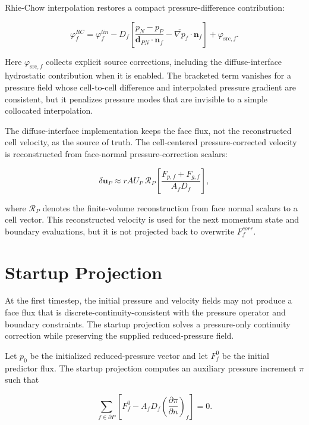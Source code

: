\documentclass[11pt]{article}
\newcommand{\grad}{\nabla}
\begin{document}
Rhie-Chow interpolation restores a compact pressure-difference contribution:

\begin{equation}
  \varphi_f^{RC}
  =
  \varphi_f^{lin}
  -
  D_f
  \left[
    \frac{p_N-p_P}{\mathbf{d}_{PN}\cdot\mathbf{n}_f}
    -
    \overline{\grad p}_f\cdot\mathbf{n}_f
  \right]
  +
  \varphi_{\mathrm{src},f}.
  \label{eq:rhie-chow}
\end{equation}

Here \(\varphi_{\mathrm{src},f}\) collects explicit source corrections, including
the diffuse-interface hydrostatic contribution when it is enabled.  The bracketed
term vanishes for a pressure field whose cell-to-cell difference and
interpolated pressure gradient are consistent, but it penalizes pressure modes
that are invisible to a simple collocated interpolation.

The diffuse-interface implementation keeps the face flux, not the reconstructed
cell velocity, as the source of truth.  The cell-centered pressure-corrected
velocity is reconstructed from face-normal pressure-correction scalars:

\begin{equation}
  \delta\mathbf{u}_P
  \approx
  rAU_P\,
  \mathcal{R}_P
  \left[
    \frac{F_{p,f}+F_{g,f}}{A_fD_f}
  \right],
  \label{eq:velocity-writeback}
\end{equation}

where \(\mathcal{R}_P\) denotes the finite-volume reconstruction from face
normal scalars to a cell vector.  This reconstructed velocity is used for the
next momentum state and boundary evaluations, but it is not projected back to
overwrite \(F_f^{corr}\).

\section{Startup Projection}

At the first timestep, the initial pressure and velocity fields may not produce
a face flux that is discrete-continuity-consistent with the pressure operator
and boundary constraints.  The startup projection solves a pressure-only
continuity correction while preserving the supplied reduced-pressure field.

Let \(p_0\) be the initialized reduced-pressure vector and let \(F_f^0\) be the
initial predictor flux.  The startup projection computes an auxiliary pressure
increment \(\pi\) such that

\begin{equation}
  \sum_{f\in\partial P}
  \left[
    F_f^0
    -
    A_fD_f
    \left(\frac{\partial\pi}{\partial n}\right)_f
  \right]
  =
  0.
  \label{eq:startup-projection}
\end{equation}
\end{document}
